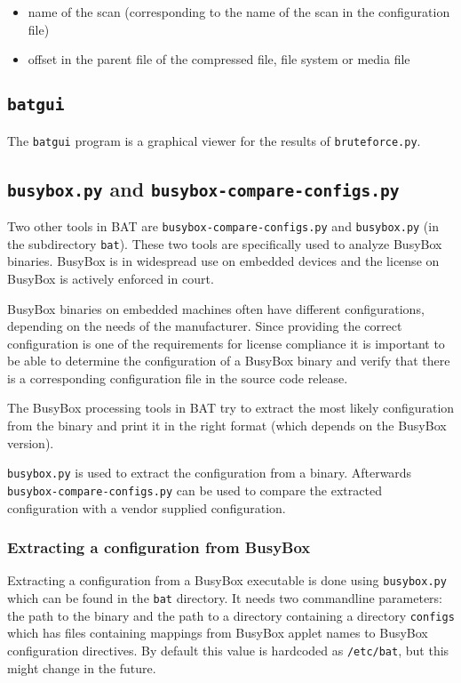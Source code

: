 \documentclass[10pt]{article}
\begin{document}
\begin{itemize}
\item name of the scan (corresponding to the name of the scan in the
configuration file)
\item offset in the parent file of the compressed file, file system or media
file
\end{itemize}

\subsection{\texttt{batgui}}

The \texttt{batgui} program is a graphical viewer for the results of
\texttt{bruteforce.py}.

\subsection{\texttt{busybox.py} and \texttt{busybox-compare-configs.py}}

Two other tools in BAT are \texttt{busybox-compare-configs.py} and
\texttt{busybox.py} (in the subdirectory \texttt{bat}). These two tools are
specifically used to analyze BusyBox binaries. BusyBox is in widespread use on
embedded devices and the license on BusyBox is actively enforced in court.

BusyBox binaries on embedded machines often have different configurations,
depending on the needs of the manufacturer. Since providing the correct
configuration is one of the requirements for license compliance it is important
to be able to determine the configuration of a BusyBox binary and verify that
there is a corresponding configuration file in the source code release.

The BusyBox processing tools in BAT try to extract the most likely
configuration from the binary and print it in the right format (which
depends on the BusyBox version).

\texttt{busybox.py} is used to extract the configuration from a binary.
Afterwards \texttt{busybox-compare-configs.py} can be used to compare the
extracted configuration with a vendor supplied configuration.

\subsubsection{Extracting a configuration from BusyBox}

Extracting a configuration from a BusyBox executable is done using
\texttt{busybox.py} which can be found in the \texttt{bat} directory. It needs
two commandline parameters: the path to the binary and the path to a directory
containing a directory \texttt{configs} which has files containing mappings
from BusyBox applet names to BusyBox configuration directives. By default this
value is hardcoded as \texttt{/etc/bat}, but this might change in the future.
\end{document}
